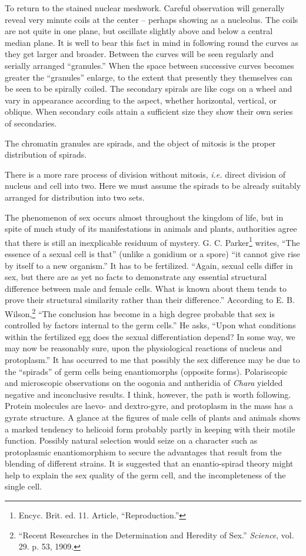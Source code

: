 \documentclass[a4paper, 12pt, oneside]{article}
\begin{document}
To return to the stained nuclear meshwork. Careful observation will generally reveal very minute coils at the center -- perhaps showing as a nucleolus. The coils are not quite in one plane, but oscillate slightly above and below a central median plane. It is well to bear this fact in mind in following round the curves as they get larger and broader. Between the curves will be seen regularly and serially arranged ``granules.'' When the space between successive curves becomes greater the ``granules'' enlarge, to the extent that presently they themselves can be seen to be spirally coiled. The secondary spirals are like cogs on a wheel and vary in appearance according to the aspect, whether horizontal, vertical, or oblique. When secondary coils attain a sufficient size they show their own series of secondaries.

The chromatin granules are spirads, and the object of mitosis is the proper distribution of spirads.

There is a more rare process of division without mitosis, \emph{i.e.} direct division of nucleus and cell into two. Here we must assume the spirads to be already suitably arranged for distribution into two sets.

The phenomenon of sex occurs almost throughout the kingdom of life, but in spite of much study of its manifestations in animals and plants, authorities agree that there is still an inexplicable residuum of mystery. G. C. Parker\footnote{Encyc. Brit. ed. 11. Article, ``Reproduction.''} writes, ``The essence of a sexual cell is that'' (unlike a gonidium or a spore) ``it cannot give rise by itself to a new organism.'' It has to be fertilized. ``Again, sexual cells differ in sex, but there are as yet no facts to demonstrate any essential structural difference between male and female cells. What is known about them tends to prove their structural similarity rather than their difference.'' According to E. B. Wilson,\footnote{``Recent Researches in the Determination and Heredity of Sex.'' \emph{Science}, vol. 29. p. 53, 1909.} ``The conclusion has become in a high degree probable that sex is controlled by factors internal to the germ cells.'' He asks, ``Upon what conditions within the fertilized egg does the sexual differentiation depend? In some way, we may now be reasonably sure, upon the physiological reactions of nucleus and protoplasm.'' It has occurred to me that possibly the sex difference may be due to the ``spirads'' of germ cells being enantiomorphs (opposite forms). Polariscopic and microscopic observations on the oogonia and antheridia of \emph{Chara} yielded negative and inconclusive results. I think, however, the path is worth following. Protein molecules are laevo- and dextro-gyre, and protoplasm in the mass has a gyrate structure. A glance at the figures of male cells of plants and animals shows a marked tendency to helicoid form probably partly in keeping with their motile function. Possibly natural selection would seize on a character such as protoplasmic enantiomorphism to secure the advantages that result from the blending of different strains. It is suggested that an enantio-spirad theory might help to explain the sex quality of the germ cell, and the incompleteness of the single cell.
\end{document}
